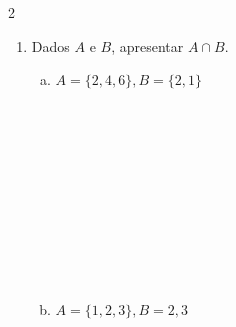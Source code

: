 \documentclass[a4paper,14pt]{article}
\begin{document}
\begin{multicols}{2}
\begin{enumerate}
\begin{enumerate}[a)]
    				\item $A = \{3, 5, 7, 9\}, B = \{1, 2, 3, 5, 7, 8, 9, 10\}$ \\\\\\\\\\\\\\\\\\\\\\
    				\item $A = \{3, 4, 6, 7, 9\}, \\ B = \{3, 4, 6, 7, 9\}$ \newpage
    				\item $A = \{1, 3, 5, 7\}, \\ B = \{2, 4, 6, 10\}$ \\\\\\\\\\\\\\\\\\\\\\
    			\end{enumerate}
    			\item Dados $A$ e $B$, apresentar $A \cap B$.
    				\begin{enumerate}[a)]
    				\item $A = \{2, 4, 6\}, B = \{2, 1\}$ \\\\\\\\\\\\\\\\\\\\\\
    				\item $A =\{1, 2, 3\}, B = {2, 3}$ \\\\\\\\\\\\\\\\\\\\\\\\

\end{enumerate}
\end{enumerate}
\end{multicols}
\end{document}

